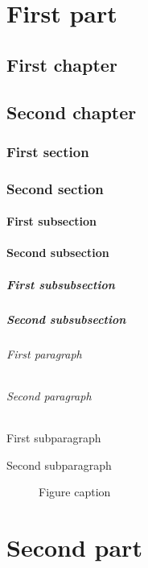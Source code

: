 \documentclass[nocopyright,baselinegrid]{uit-thesis-test}
\begin{document}
\frontmatter
\tableofcontents

\mainmatter

\part{First part}
\chapter{First chapter}
\chapter{Second chapter}
\section{First section}
\section{Second section}
\subsection{First subsection}
\subsection{Second subsection}
\subsubsection{First subsubsection}
\subsubsection{Second subsubsection}
\paragraph{First paragraph}
\paragraph{Second paragraph}
\subparagraph{First subparagraph}
\subparagraph{Second subparagraph}

\begin{figure}
\centering
{}
\caption{Figure caption}
\end{figure}

\part{Second part}
\end{document}
